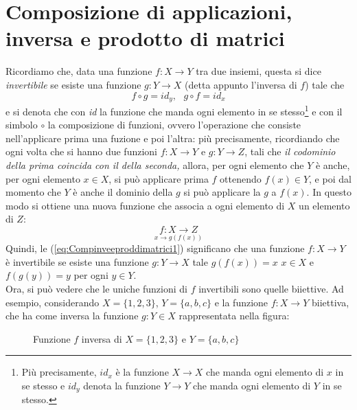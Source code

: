 \documentclass{book}
\theoremstyle{definition}
\theoremstyle{plain}
\begin{document}
\section{Composizione di applicazioni, inversa e prodotto di matrici}
\label{sec:Compinveeproddimatrici}

Ricordiamo che, data una funzione $f:X\to Y$ tra due insiemi, questa si
dice \textit{invertibile} se esiste una funzione $g:Y\to X$ (detta
appunto l'inversa di $f$) tale che
\begin{equation}
  \label{eq:Compinveeproddimatrici1}
  f \circ g=id_{y}, \text{ } g\circ f=id_{x}
\end{equation}
e si denota che con \textit{id} la funzione che manda ogni elemento in se
stesso\footnote{Più precisamente, $id_{x}$ è la funzione $X\to X$ che
  manda ogni elemento di $x$ in se stesso e $id_{y}$ denota la funzione
  $Y\to Y$ che manda ogni elemento di $Y$ in se stesso.} e con il simbolo
$\circ$ la composizione di funzioni, ovvero l'operazione che consiste
nell'applicare prima una fuzione e poi l'altra: più precisamente,
ricordiando che ogni volta che si hanno due funzioni $f:X\to Y$ e
$g:Y\to Z$, tali che \textit{il codominio della prima coincida con il
  della seconda,} allora, per ogni elemento che $Y$ è anche, per ogni
elemento $x\in X$, si può applicare prima $f$ ottenendo $f(x)\in Y$,
e poi dal momento che $Y$ è anche il dominio della $g$ si può applicare
la $g$ a $f(x)$. In questo modo si ottiene una nuova funzione che
associa a ogni elemento di $X$ un elemento di $Z$:
\begin{equation*}
  \underset{x\to g(f(x))}{f:X\to Z}
\end{equation*}
Quindi, le (\ref{eq:Compinveeproddimatrici1}) significano che una
funzione $f:X\to Y$ è invertibile se esiste una funzione $g:Y\to X$
tale $g(f(x))=x$ $x\in X$ e $f(g(y))=y$ per ogni $y\in Y$.\\
Ora, si può vedere che le uniche funzioni di $f$ invertibili sono
quelle biiettive. Ad esempio, considerando $X=\{1,2,3\}$, $Y=\{a,b,c\}$
e la funzione $f:X\to Y$ biiettiva, che ha come inversa la funzione
$g:Y\in X$ rappresentata nella figura:
\begin{figure}[ht!]
  \centering
  \resizebox{15cm}{!}{}
  \caption{Funzione $f$ inversa di $X=\{1,2,3\}$ e $Y=\{a,b,c\}$}
  \label{fig:Compinveeproddimatrici1}
\end{figure}
\end{document}
